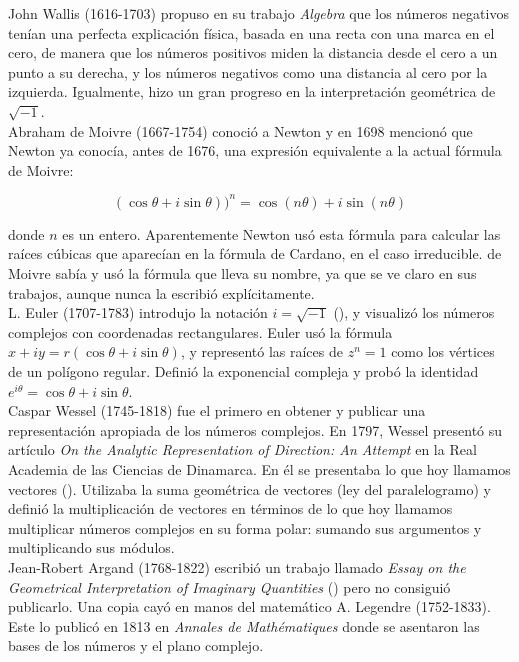 \documentclass[../main.tex]{memoir}
\begin{document}
John Wallis (1616-1703) propuso en su trabajo \textit{Algebra} que los números negativos tenían una perfecta explicación física, basada en una recta con una marca en el cero, de manera que los números positivos miden la distancia desde el cero a un punto a su derecha, y los números negativos como una distancia al cero por la izquierda. Igualmente, hizo un gran progreso en la interpretación geométrica de $\sqrt{-1}$.  \\

Abraham de Moivre (1667-1754) conoció a Newton y en 1698 mencionó que Newton ya conocía, antes de 1676, una expresión equivalente a la actual fórmula de Moivre:

$$(\cos \theta + i \sin \theta))^n = \cos(n\theta) + i \sin(n \theta)$$

donde $n$ es un entero. Aparentemente Newton usó esta fórmula para calcular las raíces cúbicas que aparecían en la fórmula de Cardano, en el caso irreducible. de Moivre sabía y usó la fórmula que lleva su nombre, ya que se ve claro en sus trabajos, aunque nunca la escribió explícitamente. \\

L. Euler (1707-1783) introdujo la notación $i = \sqrt{-1}$ (\cite{dunham1999}), y visualizó los números complejos con coordenadas rectangulares. Euler usó la fórmula $x+iy = r(\cos \theta +i \sin \theta)$, y representó las raíces de $z^n = 1$ como los vértices de un polígono regular. Definió la exponencial compleja y probó la identidad $e^{i\theta} = \cos \theta +i \sin \theta$. \\

Caspar Wessel (1745-1818) fue el primero en obtener y publicar una representación apropiada de los números complejos. En 1797, Wessel presentó su artículo \textit{On the Analytic Representation of Direction: An Attempt} en la Real Academia de las Ciencias de Dinamarca. En él se presentaba lo que hoy llamamos vectores (\cite{crowe1967}). Utilizaba la suma geométrica de vectores (ley del paralelogramo) y definió la multiplicación de vectores en términos de lo que hoy llamamos multiplicar números complejos en su forma polar: sumando sus argumentos y multiplicando sus módulos. \\

Jean-Robert Argand (1768-1822) escribió un trabajo llamado \textit{Essay on the Geometrical Interpretation of Imaginary Quantities} (\cite{argand1971}) pero no consiguió publicarlo. Una copia cayó en manos del matemático A. Legendre (1752-1833). Este lo publicó en 1813 en \textit{Annales de Mathématiques} donde se asentaron las bases de los números y el plano complejo. \\
\end{document}
